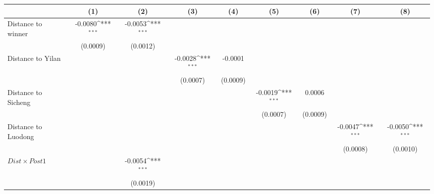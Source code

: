 {
\def\sym#1{\ifmmode^{#1}\else\(^{#1}\)\fi}
\begin{tabular}{l*{8}{c}}
\toprule
                &\multicolumn{1}{c}{(1)}         &\multicolumn{1}{c}{(2)}         &\multicolumn{1}{c}{(3)}         &\multicolumn{1}{c}{(4)}         &\multicolumn{1}{c}{(5)}         &\multicolumn{1}{c}{(6)}         &\multicolumn{1}{c}{(7)}         &\multicolumn{1}{c}{(8)}         \\
\midrule
Distance to winner&  -0.0080\sym{***}&  -0.0053\sym{***}&                  &                  &                  &                  &                  &                  \\
                & (0.0009)         & (0.0012)         &                  &                  &                  &                  &                  &                  \\
\addlinespace
Distance to Yilan&                  &                  &  -0.0028\sym{***}&  -0.0001         &                  &                  &                  &                  \\
                &                  &                  & (0.0007)         & (0.0009)         &                  &                  &                  &                  \\
\addlinespace
Distance to Sicheng&                  &                  &                  &                  &  -0.0019\sym{***}&   0.0006         &                  &                  \\
                &                  &                  &                  &                  & (0.0007)         & (0.0009)         &                  &                  \\
\addlinespace
Distance to Luodong&                  &                  &                  &                  &                  &                  &  -0.0047\sym{***}&  -0.0050\sym{***}\\
                &                  &                  &                  &                  &                  &                  & (0.0008)         & (0.0010)         \\
\addlinespace
$ Dist \times Post1$&                  &  -0.0054\sym{***}&                  &                  &                  &                  &                  &                  \\
                &                  & (0.0019)         &                  &                  &                  &                  &                  &                  \\

\end{tabular}}
